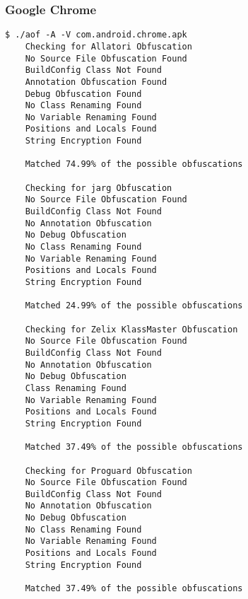 \subsubsection{Google Chrome \cite{chrome}}
\label{app:gchrome}
\begin{lstlisting}
$ ./aof -A -V com.android.chrome.apk
    Checking for Allatori Obfuscation
	No Source File Obfuscation Found
	BuildConfig Class Not Found
	Annotation Obfuscation Found
	Debug Obfuscation Found
	No Class Renaming Found
	No Variable Renaming Found
	Positions and Locals Found
	String Encryption Found

	Matched 74.99% of the possible obfuscations

    Checking for jarg Obfuscation
	No Source File Obfuscation Found
	BuildConfig Class Not Found
	No Annotation Obfuscation
	No Debug Obfuscation
	No Class Renaming Found
	No Variable Renaming Found
	Positions and Locals Found
	String Encryption Found

	Matched 24.99% of the possible obfuscations

    Checking for Zelix KlassMaster Obfuscation
	No Source File Obfuscation Found
	BuildConfig Class Not Found
	No Annotation Obfuscation
	No Debug Obfuscation
	Class Renaming Found
	No Variable Renaming Found
	Positions and Locals Found
	String Encryption Found

	Matched 37.49% of the possible obfuscations

    Checking for Proguard Obfuscation
	No Source File Obfuscation Found
	BuildConfig Class Not Found
	No Annotation Obfuscation
	No Debug Obfuscation
	No Class Renaming Found
	No Variable Renaming Found
	Positions and Locals Found
	String Encryption Found

	Matched 37.49% of the possible obfuscations
\end{lstlisting}
\newpage
